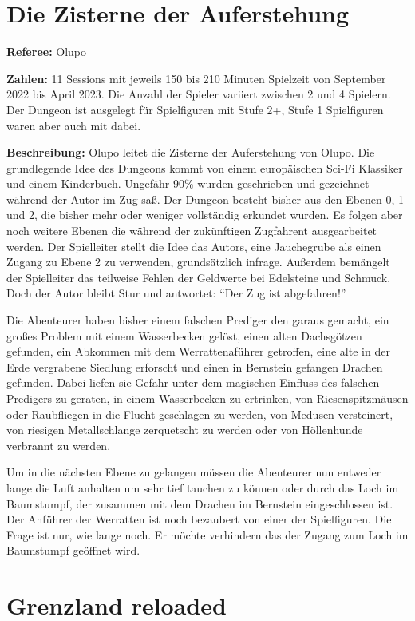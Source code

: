 \documentclass[11pt]{wbzine}
\begin{document}
\begin{multicols}{2}
\section{Die Zisterne der Auferstehung}

\textbf{Referee:} Olupo

\textbf{Zahlen:} 11 Sessions mit jeweils 150 bis 210 Minuten Spielzeit von
September 2022 bis April 2023. Die Anzahl der Spieler variiert zwischen
2 und 4 Spielern. Der Dungeon ist ausgelegt für Spielfiguren mit Stufe
2+, Stufe 1 Spielfiguren waren aber auch mit dabei.

\textbf{Beschreibung:} Olupo leitet die Zisterne der Auferstehung von
Olupo. Die grundlegende Idee des Dungeons kommt von einem europäischen
Sci-Fi Klassiker und einem Kinderbuch. Ungefähr 90\% wurden geschrieben
und gezeichnet während der Autor im Zug saß. Der Dungeon besteht bisher
aus den Ebenen 0, 1 und 2, die bisher mehr oder weniger vollständig
erkundet wurden. Es folgen aber noch weitere Ebenen die während der
zukünftigen Zugfahrent ausgearbeitet werden. Der Spielleiter stellt
die Idee das Autors, eine Jauchegrube als einen Zugang zu Ebene 2 zu
verwenden, grundsätzlich infrage. Außerdem bemängelt der Spielleiter
das teilweise Fehlen der Geldwerte bei Edelsteine und Schmuck. Doch der
Autor bleibt Stur und antwortet: ``Der Zug ist abgefahren!''

Die Abenteurer haben bisher einem falschen Prediger den garaus gemacht,
ein großes Problem mit einem Wasserbecken gelöst, einen alten
Dachsgötzen gefunden, ein Abkommen mit dem Werrattenaführer getroffen,
eine alte in der Erde vergrabene Siedlung erforscht und einen in Bernstein
gefangen Drachen gefunden. Dabei liefen sie Gefahr unter dem magischen
Einfluss des falschen Predigers zu geraten, in einem Wasserbecken
zu ertrinken, von Riesenspitzmäusen oder Raubfliegen in die Flucht
geschlagen zu werden, von Medusen versteinert, von riesigen Metallschlange
zerquetscht zu werden oder von Höllenhunde verbrannt zu werden.

Um in die nächsten Ebene zu gelangen müssen die Abenteurer nun
entweder lange die Luft anhalten um sehr tief tauchen zu können oder
durch das Loch im Baumstumpf, der zusammen mit dem Drachen im Bernstein
eingeschlossen ist. Der Anführer der Werratten ist noch bezaubert von
einer der Spielfiguren. Die Frage ist nur, wie lange noch. Er möchte
verhindern das der Zugang zum Loch im Baumstumpf geöffnet wird.

\section{Grenzland reloaded}


\end{multicols}
\end{document}
